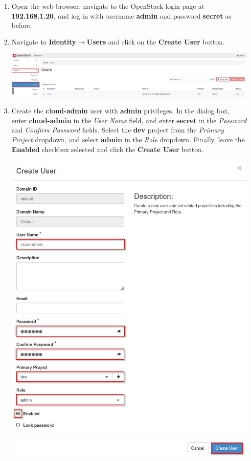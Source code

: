 \documentclass[letterpaper, 12pt]{article}
\begin{document}
\begin{enumerate}
    \item Open the web browser, navigate to the OpenStack login page at \textbf{192.168.1.20}, and log in with username
    \textbf{admin} and password \textbf{secret} as before.

    \item Navigate to \textbf{Identity$\rightarrow$Users} and click on the \textbf{Create User} button.
    
    \begin{center}
        \includegraphics[width=\linewidth]{images/part5/step2.png}
    \end{center}

    \item Create the \textbf{cloud-admin} user with \textbf{admin} privileges. In the dialog box, enter
    \textbf{cloud-admin} in the \textit{User Name} field, and enter \textbf{secret} in the \textit{Password} and
    \textit{Confirm Password} fields. Select the \textbf{dev} project from the \textit{Primary Project} dropdown, and
    select \textbf{admin} in the \textit{Role} dropdown. Finally, leave the \textbf{Enabled} checkbox selected and click
    the \textbf{Create User} button.

    \begin{center}
        \includegraphics[width=\linewidth]{images/part5/step3.png}
    \end{center}


\end{enumerate}
\end{document}
